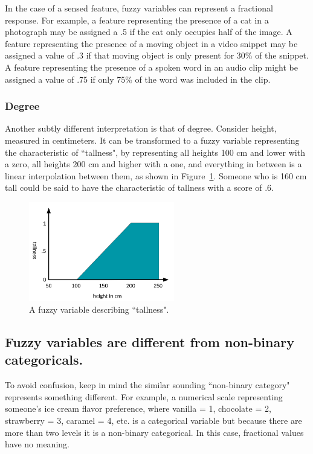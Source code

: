 In the case of a sensed feature, fuzzy variables can represent
a fractional response. For example, a feature representing the presence
of a cat in a photograph may be assigned a .5 if the cat only occupies
half of the image. A feature representing the presence of a moving object 
in a video snippet may be assigned a value of .3 if that moving object is
only present for 30\% of the snippet. A feature representing the
presence of a spoken word in an audio clip might be assigned a value
of .75 if only 75\% of the word was included in the clip.

\subsubsection{Degree}
\label{subsubsec:fuzzydegree}

Another subtly different interpretation is that of degree. Consider height,
measured in centimeters. It can be transformed to a fuzzy variable
representing the characteristic of ``tallness", by representing all
heights 100 cm and lower with a zero, all heights 200 cm and higher with
a one, and everything in between is a linear interpolation between them,
as shown in Figure~\ref{fig:fuzzytall}.
Someone who is 160 cm tall could be said to have the characteristic of
tallness with a score of .6.

\begin{figure}[ht]
\vskip 0.2in
\begin{center}
\centerline{\includegraphics[width=2.5in]{images/fuzzy_tallness.png}}
\caption{A fuzzy variable describing ``tallness".}
\label{fig:fuzzytall}
\end{center}
\vskip -0.2in
\end{figure}

\subsection{Fuzzy variables are different from non-binary categoricals.}
\label{subsec:fuzzynotes}

To avoid confusion, keep in mind the similar sounding ``non-binary category"
represents something different. For example, a numerical scale representing
someone’s ice cream flavor preference, where vanilla = 1,
chocolate = 2, strawberry = 3, caramel = 4, etc. is a categorical variable
but because there are more than two levels it is a non-binary categorical.
In this case, fractional values have no meaning.

